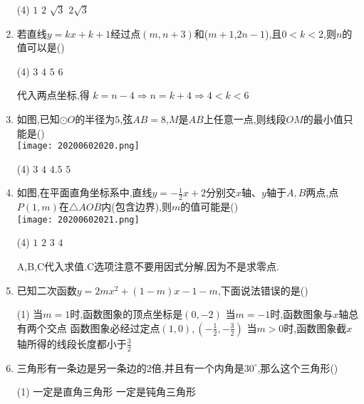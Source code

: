 \documentclass[cn,blue,12pt]{elegantbook}
\renewcommand \tkt[1]{{\CJKunderline[hidden=true, skip=true, thickness=1pt]{#1}}}
\begin{document}
\begin{enumerate}
\begin{tasks}(4)
\task \(1\)
\task \(2\)
\task \(\sqrt{3}\)
\task \(2\sqrt{3}\)
\end{tasks}
\item 若直线\(y = kx+k+1\)经过点\((m,n+3)\)和(\(m + 1\),\(2n-1\)),且\(0<k<2\),则\(n\)的值可以是(\tkt{D})\\
\begin{tasks}(4)
\task \(3\)
\task \(4\)
\task \(5\)
\task \(6\)
\end{tasks}
\begin{solution}
    代入两点坐标,得 \(k=n-4 \Rightarrow n=k+4 \Rightarrow 4<k<6\)
\end{solution}
\item 如图,已知\(\odot O\)的半径为\(5\),弦\(AB=8\),\(M\)是\(AB\)上任意一点,则线段\(OM\)的最小值只能是(\tkt{A})\\
\texttt{[image: 20200602020.png]}\\
\begin{tasks}(4)
\task \(3\)
\task \(4\)
\task \(4.5\)
\task \(5\)
\end{tasks}
\item 如图,在平面直角坐标系中,直线\(y= -\frac{1}{2}x+2\)分别交\(x\)轴、\(y\)轴于\(A,B\)两点,点\(P(1,m)\)在\( \triangle AOB\)内(包含边界),则\(m\)的值可能是(\tkt{A})\\
\texttt{[image: 20200602021.png]}\\
\begin{tasks}(4)
\task \(1\)
\task \(2\)
\task \(3\)
\task \(4\)
\end{tasks}
\begin{solution}
    A,B,C代入求值.C选项注意不要用因式分解,因为不是求零点.
\end{solution}
\item 已知二次函数\(y=2mx^2 + (1 -m)x-1-m\),下面说法错误的是(\tkt{D})\\
  \begin{tasks}(1)
  \task 当\(m = 1\)时,函数图象的顶点坐标是\((0, -2)\)
  \task 当\(m = -1\)时,函数图象与\(x\)轴总有两个交点
  \task 函数图象必经过定点\((1,0),(-\frac{1}{2},-\frac{3}{2})\)
  \task 当\(m >0\)时,函数图象截\(x\)轴所得的线段长度都小于\(\frac{3}{2}\)
\end{tasks}
  \item 三角形有一条边是另一条边的\(2\)倍,并且有一个内角是\(30^\circ \),那么这个三角形(\tkt{D})\\
    \begin{tasks}(1)
\task 一定是直角三角形
\task 一定是钝角三角形

\end{tasks}
\end{enumerate}
\end{document}
